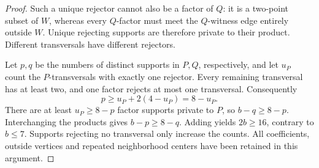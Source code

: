 \documentclass[11pt]{article}
\theoremstyle{definition}
\theoremstyle{remark}
\begin{document}
\begin{proof}
Such a unique rejector cannot also be a factor of $Q$: it is a two-point
subset of $W$, whereas every $Q$-factor must meet the $Q$-witness edge
entirely outside $W$. Unique rejecting supports are therefore private to
their product. Different transversals have different rejectors.

Let $p,q$ be the numbers of distinct supports in $P,Q$, respectively,
and let $u_P$ count the $P$-transversals with exactly one rejector.
Every remaining transversal has at least two, and one factor rejects at
most one transversal. Consequently
\[
 p\ge u_P+2(4-u_P)=8-u_P.
\]
There are at least $u_P\ge8-p$ factor supports private to $P$, so
$b-q\ge8-p$. Interchanging the products gives $b-p\ge8-q$.
Adding yields $2b\ge16$, contrary to $b\le7$.
Supports rejecting no transversal only increase the counts.
All coefficients, outside vertices and repeated neighborhood centers have
been retained in this argument.
\end{proof}
\end{document}

